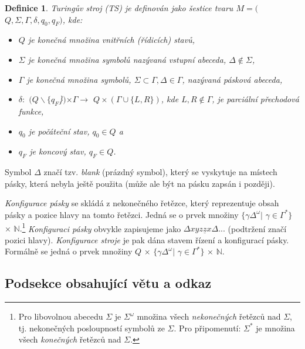 \documentclass[11pt, a4paper, twocolumn]{article}
\newtheorem{def1}{Definice}
\begin{document}
\begin{def1}\label{definice 1} \textup{Turingův stroj} (TS) je definován jako šestice tvaru $M = ($$Q, \Sigma, \Gamma, \delta, q_0, q_F)$, kde:
    \begin{itemize}
        \item $Q$ je konečná množina \textup{vnitřních (řídicích) stavů,}
        
        \item $\Sigma$ je konečná množina symbolů nazývaná \textup{vstupní abeceda}, $\Delta\notin\Sigma$,
        
        \item $\Gamma$ je konečná množina symbolů, $\Sigma \subset \Gamma, \Delta \in \Gamma$, nazývaná \textup{pásková abeceda},
        
        \item $\delta :$ $(Q\backslash\{q_F$\}$)$$\times\Gamma\to $ $Q\times(\Gamma\cup\{L, R\})$, kde $L,R\notin\Gamma$, je parciální\textup{ přechodová funkce,}
        
        \item $q_0$ je počáteční stav, $q_0 \in Q$ a
        
        \item $q_F$ je koncový stav, $q_F \in Q$.
    \end{itemize}
\end{def1}



Symbol $\Delta$ značí tzv. \emph{blank} (prázdný symbol), který se vyskytuje na místech pásky, která nebyla ještě použita (může ale být na pásku zapsán i později).

\emph{Konfigurace pásky} se skládá z nekonečného řetězce, který reprezentuje obsah pásky a pozice hlavy na tomto řetězci. Jedná se o prvek množiny $\{\gamma\Delta^\omega|$ $\gamma\in\Gamma^*\}$ $\times$ $\mathbb{N}.$\footnote{Pro libovolnou abecedu $\Sigma$ je $\Sigma^\omega$ množina všech \emph{nekonečných} řetězců nad $\Sigma$, tj. nekonečných posloupností symbolů ze $\Sigma$. Pro připomenutí: $\Sigma^*$ je množina všech \emph{konečných} řetězců nad $\Sigma$.} \emph{Konfiguraci pásky} obvykle zapisujeme jako $\Delta$\emph{$xyz\underline{z}x$}$\Delta...$ (podtržení značí pozici hlavy). \emph{Konfigurace stroje} je pak dána stavem řízení a konfigurací pásky. Formálně se jedná o prvek množiny $Q$ $\times$ $\{\gamma\Delta^\omega|$ $\gamma\in\Gamma^*\}$ $\times$ $\mathbb{N}$.

\subsection{Podsekce obsahující větu a odkaz}
\end{document}
